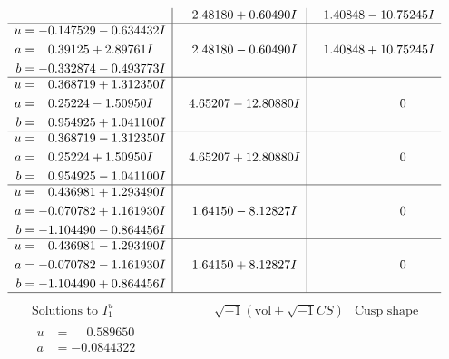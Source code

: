 \documentclass[1p]{elsarticle_modified}
\theoremstyle{definition}
\newcommand{\I}{\sqrt{-1}}
\begin{document}
$$\begin{array}{c|c|c}
 & \phantom{-}2.48180 + 0.60490 I & \phantom{-}1.40848 - 10.75245 I \\ \hline\begin{aligned}
u &= -0.147529 - 0.634432 I \\
a &= \phantom{-}0.39125 + 2.89761 I \\
b &= -0.332874 - 0.493773 I\end{aligned}
 & \phantom{-}2.48180 - 0.60490 I & \phantom{-}1.40848 + 10.75245 I \\ \hline\begin{aligned}
u &= \phantom{-}0.368719 + 1.312350 I \\
a &= \phantom{-}0.25224 - 1.50950 I \\
b &= \phantom{-}0.954925 + 1.041100 I\end{aligned}
 & \phantom{-}4.65207 - 12.80880 I & \phantom{-0.000000 } 0 \\ \hline\begin{aligned}
u &= \phantom{-}0.368719 - 1.312350 I \\
a &= \phantom{-}0.25224 + 1.50950 I \\
b &= \phantom{-}0.954925 - 1.041100 I\end{aligned}
 & \phantom{-}4.65207 + 12.80880 I & \phantom{-0.000000 } 0 \\ \hline\begin{aligned}
u &= \phantom{-}0.436981 + 1.293490 I \\
a &= -0.070782 + 1.161930 I \\
b &= -1.104490 - 0.864456 I\end{aligned}
 & \phantom{-}1.64150 - 8.12827 I & \phantom{-0.000000 } 0 \\ \hline\begin{aligned}
u &= \phantom{-}0.436981 - 1.293490 I \\
a &= -0.070782 - 1.161930 I \\
b &= -1.104490 + 0.864456 I\end{aligned}
 & \phantom{-}1.64150 + 8.12827 I & \phantom{-0.000000 } 0\\
 \hline 
 \end{array}$$\newpage$$\begin{array}{c|c|c}  
\text{Solutions to }I^u_{1}& \I (\text{vol} + \sqrt{-1}CS) & \text{Cusp shape}\\
 \hline 
\begin{aligned}
u &= \phantom{-}0.589650\phantom{ +0.000000I} \\
a &= -0.0844322\phantom{ +0.000000I} \\

\end{aligned}
\end{array}$$
\end{document}
